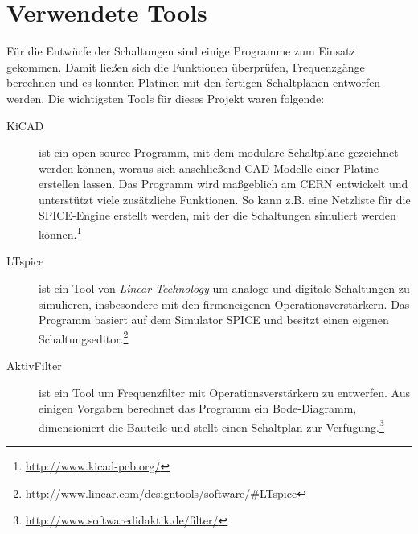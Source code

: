 \section{Verwendete Tools}
Für die Entwürfe der Schaltungen sind einige Programme zum Einsatz gekommen. Damit ließen sich die Funktionen überprüfen, Frequenzgänge berechnen und es konnten Platinen mit den fertigen Schaltplänen entworfen werden. Die wichtigsten Tools für dieses Projekt waren folgende:
\begin{description}
	\item[KiCAD] ist ein open-source Programm, mit dem modulare Schaltpläne gezeichnet werden können, woraus sich anschließend \ac{CAD}-Modelle einer Platine erstellen lassen. Das Programm wird maßgeblich am \ac{CERN} entwickelt und unterstützt viele zusätzliche Funktionen. So kann z.B. eine Netzliste für die \ac{SPICE}-Engine erstellt werden, mit der die Schaltungen simuliert werden können.\footnote{\url{http://www.kicad-pcb.org/}}
	\item[LTspice] ist ein Tool von \textit{Linear Technology} um analoge und digitale Schaltungen zu simulieren, insbesondere mit den firmeneigenen Operationsverstärkern. Das Programm basiert auf dem Simulator \ac{SPICE} und besitzt einen eigenen Schaltungseditor.\footnote{\url{http://www.linear.com/designtools/software/\#LTspice}}
	\item[AktivFilter] ist ein Tool um Frequenzfilter mit Operationsverstärkern zu entwerfen. Aus einigen Vorgaben berechnet das Programm ein Bode-Diagramm, dimensioniert die Bauteile und stellt einen Schaltplan zur Verfügung.\footnote{\url{http://www.softwaredidaktik.de/filter/}}
\end{description}


